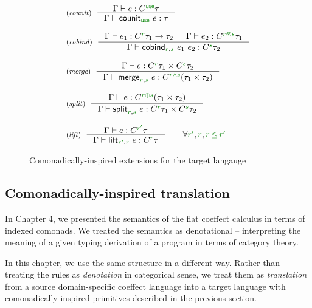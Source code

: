 \documentclass[
		twoside,openright,titlepage,numbers=noenddot,headinclude,%
                footinclude=true,cleardoublepage=empty,
                BCOR=10mm,paper=a4,fontsize=10pt, %
                ngerman,american, %
                ]{scrreprt}
\newcommand{\ident}[1]{\textnormal{\sffamily #1}}
\newcommand{\ctyp}[2]{C^{#1}#2}
\newcommand{\tyrule}[3]{ \inference[\footnotesize{(\emph{#1})}~~]{#2}{#3} }
\newcommand{\cclrd}[1]{\textcolor{cclr}{#1}}
\newcommand{\cunit}{ \textcolor{cclr}{ \mathsf{use} } }
\newcommand{\cseq}{ \textcolor{cclr}{ \circledast }}
\newcommand{\cpar}{ \textcolor{cclr}{\oplus} }
\newcommand{\czip}{ \textcolor{cclr}{\wedge} } %
\newcommand{\cleq}{ \textcolor{cclr}{\leq} }
\begin{document}
\begin{figure}[t]
\begin{equation*}
\begin{array}{l}
\tyrule{counit}
  {\Gamma \vdash e : \ctyp{\cunit}{\tau}}
  {\Gamma \vdash \ident{counit}_{\cunit}~e : \tau} \\
\\
\tyrule{cobind}
  {\Gamma \vdash e_1 : \ctyp{\cclrd{r}}{\tau_1} \rightarrow \tau_2 & \Gamma \vdash e_2 : \ctyp{\cclrd{r}\cseq\cclrd{s}}{\tau_1} }
  {\Gamma \vdash \ident{cobind}_{\cclrd{r}, \cclrd{s}}~e_1~e_2 : \ctyp{\cclrd{s}}{\tau_2}} \\
  \\
\tyrule{merge}
  {\Gamma \vdash  e : \ctyp{\cclrd{r}}{\tau_1} \times \ctyp{\cclrd{s}}{\tau_2} } 
  {\Gamma \vdash  \ident{merge}_{\cclrd{r},\cclrd{s}}~e : \ctyp{\cclrd{r}\czip\cclrd{s}}{(\tau_1 \times \tau_2)} }\\
    \\
\tyrule{split}
  {\Gamma \vdash  e : \ctyp{\cclrd{r}\cpar\cclrd{s}}{(\tau_1 \times \tau_2)} }
  {\Gamma \vdash  \ident{split}_{\cclrd{r},\cclrd{s}}~e : \ctyp{\cclrd{r}}{\tau_1} \times \ctyp{\cclrd{s}}{\tau_2}} \\
\\
\tyrule{lift}
  {\Gamma \vdash  e : \ctyp{\cclrd{r'}}{\tau} }
  {\Gamma \vdash \ident{lift}_{\cclrd{r'},\cclrd{r}}~e : \ctyp{\cclrd{r}}{\tau} } \qquad\forall \cclrd{r'},\cclrd{r}, \cclrd{r}\,\cleq\,\cclrd{r'}
\\
\end{array}
\end{equation*}

\caption{Comonadically-inspired extensions for the target langauge}
\label{fig:transl-ext}
\end{figure}


\subsection{Comonadically-inspired translation}

In Chapter 4, we presented the semantics of the flat coeffect calculus in terms of indexed comonads.
We treated the semantics as denotational -- interpreting the meaning of a given typing derivation
of a program in terms of category theory.

In this chapter, we use the same structure in a different way. Rather than treating the rules as
\emph{denotation} in categorical sense, we treat them as \emph{translation} from a source 
domain-specific coeffect language into a target language with comonadically-inspired primitives
described in the previous section.
\end{document}
